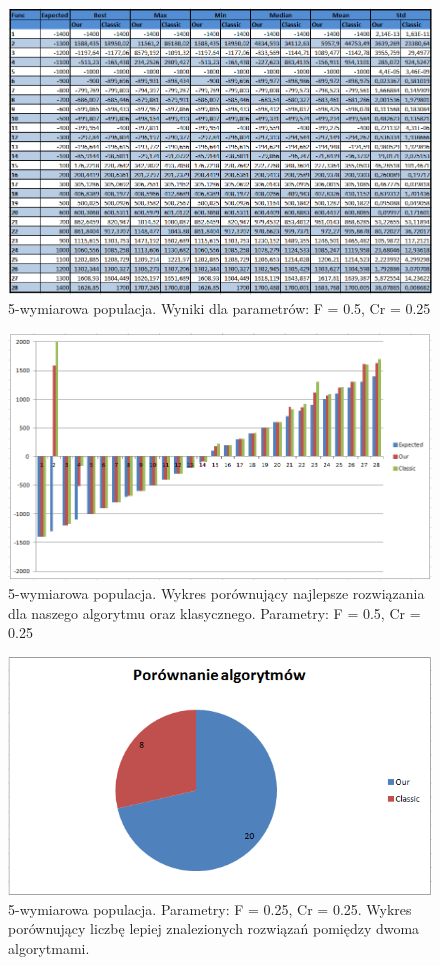 \documentclass[a4paper]{article}
\begin{document}
\begin{figure}[!h]
\centering
\includegraphics[width=\textwidth]{F5Cr25L5tab.png}
\caption{5-wymiarowa populacja. Wyniki dla parametrów: F = 0.5, Cr = 0.25}
\end{figure}

\begin{figure}[!h]
\centering
\includegraphics[width=\textwidth]{F5Cr25L5chart.png}
\caption{5-wymiarowa populacja. Wykres porównujący najlepsze rozwiązania dla naszego algorytmu oraz klasycznego. Parametry: F = 0.5, Cr = 0.25}
\end{figure}

\begin{figure}[!h]
\centering
\includegraphics[width=\textwidth]{F5Cr25L5statystyka.png}
\caption{5-wymiarowa populacja. Parametry: F = 0.25, Cr = 0.25. Wykres porównujący liczbę lepiej znalezionych rozwiązań pomiędzy dwoma algorytmami.}
\end{figure}
\end{document}
